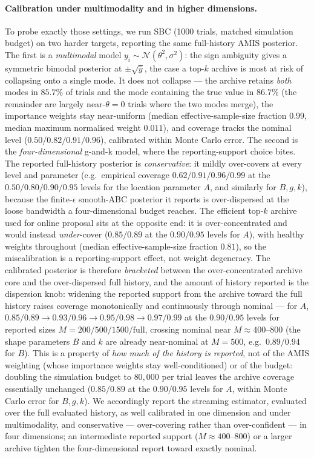 \paragraph{Calibration under multimodality and in higher dimensions.} To probe exactly those settings, we run SBC (1000 trials, matched simulation budget) on two harder targets, reporting the same full-history AMIS posterior. The first is a \emph{multimodal} model $y_i\sim\mathcal N(\theta^2,\sigma^2)$: the sign ambiguity gives a symmetric bimodal posterior at $\pm\sqrt{\bar y}$, the case a top-$k$ archive is most at risk of collapsing onto a single mode. It does not collapse --- the archive retains \emph{both} modes in $85.7\%$ of trials and the mode containing the true value in $86.7\%$ (the remainder are largely near-$\theta{=}0$ trials where the two modes merge), the importance weights stay near-uniform (median effective-sample-size fraction $0.99$, median maximum normalised weight $0.011$), and coverage tracks the nominal level ($0.50/0.82/0.91/0.96$), calibrated within Monte Carlo error. The second is the \emph{four-dimensional} g-and-k model, where the reporting-support choice bites. The reported full-history posterior is \emph{conservative}: it mildly over-covers at every level and parameter (e.g.\ empirical coverage $0.62/0.91/0.96/0.99$ at the $0.50/0.80/0.90/0.95$ levels for the location parameter $A$, and similarly for $B,g,k$), because the finite-$\epsilon$ smooth-ABC posterior it reports is over-dispersed at the loose bandwidth a four-dimensional budget reaches. The efficient top-$k$ archive used for online proposal sits at the opposite end: it is over-concentrated and would instead \emph{under}-cover ($0.85/0.89$ at the $0.90/0.95$ levels for $A$), with healthy weights throughout (median effective-sample-size fraction $0.81$), so the miscalibration is a reporting-support effect, not weight degeneracy. The calibrated posterior is therefore \emph{bracketed} between the over-concentrated archive core and the over-dispersed full history, and the amount of history reported is the dispersion knob: widening the reported support from the archive toward the full history raises coverage monotonically and continuously through nominal --- for $A$, $0.85/0.89 \to 0.93/0.96 \to 0.95/0.98 \to 0.97/0.99$ at the $0.90/0.95$ levels for reported sizes $M=200/500/1500/\text{full}$, crossing nominal near $M\approx400$--$800$ (the shape parameters $B$ and $k$ are already near-nominal at $M{=}500$, e.g.\ $0.89/0.94$ for $B$). This is a property of \emph{how much of the history is reported}, not of the AMIS weighting (whose importance weights stay well-conditioned) or of the budget: doubling the simulation budget to $80{,}000$ per trial leaves the archive coverage essentially unchanged ($0.85/0.89$ at the $0.90/0.95$ levels for $A$, within Monte Carlo error for $B,g,k$). We accordingly report the streaming estimator, evaluated over the full evaluated history, as well calibrated in one dimension and under multimodality, and conservative --- over-covering rather than over-confident --- in four dimensions; an intermediate reported support ($M\approx400$--$800$) or a larger archive tighten the four-dimensional report toward exactly nominal.

